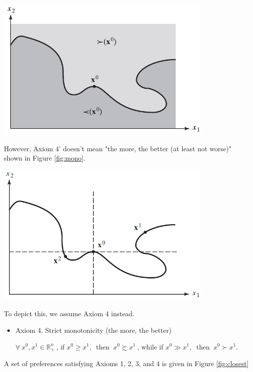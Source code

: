 \documentclass{article}
\newcommand{\R}{\mathbb{R}}
\begin{document}
\begin{mdframed}[backgroundcolor=blue!20,linecolor=white]
{\centering
\includegraphics[width=0.8\textwidth]{1.line}
\label{fig:line}}
\vspace{2mm}

However, Axiom 4' doesn't mean "the more, the better (at least not worse)" shown in Figure \ref{fig:mono}.
\vspace{2mm}

{\centering
\includegraphics[width=0.8\textwidth]{1.mono}
\label{fig:mono}}
\vspace{2mm}

To depict this, we assume Axiom 4 instead.

\begin{itemize}
\item Axiom 4. Strict monotonicity (the more, the better)

$\forall \ x^0, x^1 \in \R^n_+ \ $, if $x^0 \ge x^1, \ $ then  $\ x^0 \succsim x^1 \ $, while if 
$x^0 \gg x^1, \ $ then  $\ x^0 \succ x^1$.
\end{itemize}

A set of preferences satisfying Axioms 1, 2, 3, and 4 is given in Figure \ref{fig:closest}
\vspace{2mm}


\end{mdframed}
\end{document}
